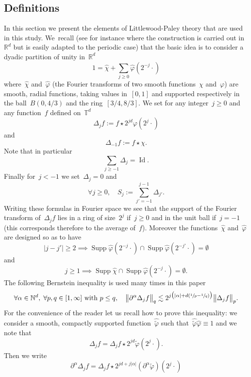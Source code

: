 \documentclass[10pt]{amsart}
\DeclareMathOperator{\Supp}{Supp}
\theoremstyle{definition}
\newcommand\R{\mathbb{R}}
\newcommand\N{\mathbb{N}}
\newcommand\T{\mathbb{T}}
\DeclareMathOperator\Id{Id}
\begin{document}
\subsection{Definitions}
In this section we present the elements of Littlewood-Paley theory that are used in this study. We~recall (see for instance \cite{BCD} where the construction is carried out in~$\R^d$ but is easily adapted to the periodic case) that the basic idea is to consider a dyadic partition of unity in~$\R^d$
\[
1 = \widehat\chi + \sum_{j \geq 0} \widehat \varphi (2^{-j} \cdot)
\]
where~$\widehat\chi$ and~$\widehat\varphi$ (the Fourier transforms of two smooth functions~$\chi$ and~$\varphi$) are smooth, radial functions, taking values in~$[0,1]$ and supported respectively in the ball~$B(0,4/3)$ and the ring~$[3/4,8/3]$.
We set for any integer~$j \geq 0$ and any function~$f$ defined on~$\T^d$
\begin{equation}\label{eq:def Delta j}
\Delta_j f:= f \star 2^{jd} \varphi (2^j \cdot)
\end{equation}
and
\[
\Delta_{-1} f:= f \star \chi.
\]
Note that in particular
\[
\sum_{j \geq -1}\Delta_j = \Id.
\]
Finally for~$j < -1$ we set~$\Delta_{ j} = 0$ and
\[
\forall j \geq 0, \quad S_j:= \sum_{j'=-1}^{j-1}\Delta_{j'}.
\]
Writing these formulas in Fourier space we see that the support of the Fourier transform of~$ \Delta_j f$ lies in a ring of size~$2^j$
if~$j \geq 0$ and in the unit ball if~$j = -1$ (this corresponds therefore to the average of~$f$). Moreover the functions~$\widehat\chi$ and~$\widehat\varphi$ are designed so as to have
\[
|j-j' | \geq 2 \implies \Supp \widehat \varphi (2^{-j} \cdot) \cap \Supp \widehat \varphi (2^{-j'} \cdot) = \emptyset
\]
and
\[
j \geq 1 \implies \Supp \widehat \chi \cap \Supp \widehat \varphi (2^{-j} \cdot) = \emptyset.
\]
The following Bernstein inequality is used many times in this paper
\begin{equation}\label{eq:bernstein}
\forall \alpha \in \N^d, \; \forall p,q\in[1,\infty]\text{ with }p\leq q, \quad \big\|\partial^\alpha \Delta_j f \big\|_{q} \lesssim 2^{j \bigl(|\alpha| + d (\sfrac1p-\sfrac1q)\bigr)} \big\|\Delta_j f\big\|_{p}.
\end{equation}
For the convenience of the reader let us recall how to prove this inequality: we consider a smooth, compactly supported function~$\widehat{\widetilde \varphi}$ such that~$
\widehat{\widetilde \varphi }\widehat \varphi \equiv 1$ and we note that
\[
\Delta_j f = \Delta_j f \star 2^{jd} \widetilde\varphi (2^j \cdot).
\]
Then we write
\[
\partial^\alpha \Delta_jf = \Delta_j f \star 2^{jd+j|\alpha|} (\partial^\alpha\widetilde\varphi) (2^j \cdot)
\]
\end{document}
